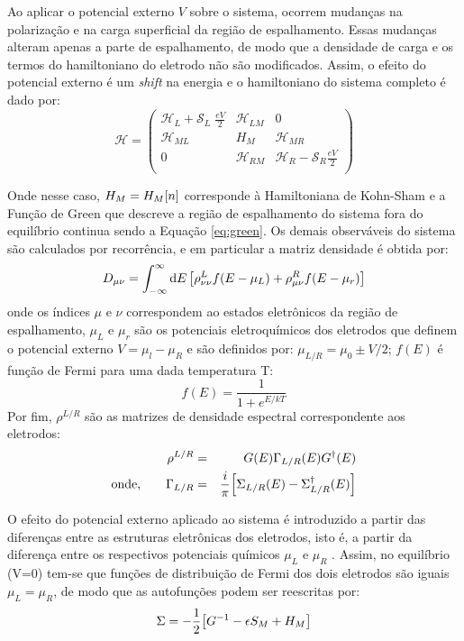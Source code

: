 Ao aplicar o potencial externo $V$  sobre o sistema, ocorrem mudanças na polarização e na carga superficial da região de espalhamento. Essas mudanças alteram apenas a parte de espalhamento, de modo que a densidade de carga e os termos do hamiltoniano do eletrodo não são modificados. Assim,  o efeito do potencial externo é um \textit{shift} na energia e o hamiltoniano do sistema completo é dado por:
\begin{equation}
    \mathcal{H}=\begin{pmatrix}
\mathcal{H}_L+\mathcal{S}_L\;\frac{eV}{2} & \mathcal{H}_{LM} &0  \\
\mathcal{H}_{ML} & H_M & \mathcal{H}_{MR} \\
0 & \mathcal{H}_{RM} & \mathcal{H}_R-\mathcal{S}_R\frac{eV}{2} \\
\end{pmatrix}
\end{equation}

Onde nesse caso, $H_M=H_M\bqty{n}$ corresponde à Hamiltoniana de Kohn-Sham e a Função de Green que descreve a região de espalhamento do sistema fora do equilíbrio continua sendo a Equação \eqref{eq:green}. Os demais observáveis do sistema são calculados por recorrência, e em particular a matriz densidade é obtida por:
\begin{equation}\label{eq:matriz-densidade}
    D_{\mu\nu}=\int_{-\infty}^{\infty}\dd{E}\bqty{\rho_{\nu\nu}^L f(E-\mu_L)+\rho_{\mu\nu}^Rf(E-\mu_r)}
\end{equation}
onde os índices $\mu$ e $\nu$ correspondem ao estados eletrônicos da região de espalhamento, $\mu_L$ e $\mu_r$ são os potenciais eletroquímicos dos eletrodos que definem o potencial externo $V=\mu_l-\mu_R$ e são definidos por: $\mu_{L/R}=\mu_0\pm V/2$; $f(E)$ é função de Fermi para uma dada temperatura T:$$f(E)=\frac{1}{1+e^{E/kT}}$$
Por fim, $\rho^{L/R}$ são as matrizes de densidade espectral correspondente aos eletrodos:
\begin{eqnarray}
    \rho^{L/R}&=&G(E)\Gamma_{L/R}(E)G^{\dagger}(E)\\
    \text{onde,}\qquad\Gamma_{L/R}&=&\frac{i}{\pi}\bqty{\Sigma_{L/R}(E)-\Sigma^{\dagger}_{L/R}(E)}
\end{eqnarray}

O efeito do potencial externo aplicado ao sistema é introduzido a partir das diferenças entre as estruturas eletrônicas dos eletrodos, isto é, a partir da diferença entre os respectivos potenciais químicos $  \mu_L$ e $ \mu_R  $ \cite{negf}. Assim, no equilíbrio (V=0) tem-se que funções de distribuição de Fermi dos dois eletrodos são iguais $ \mu_L=\mu_R $, de modo que as autofunções podem ser reescritas por:
\begin{equation}
	\Sigma=-\frac{1}{2}\bqty{G^{-1}-\epsilon S_M+H_M}
\end{equation}

